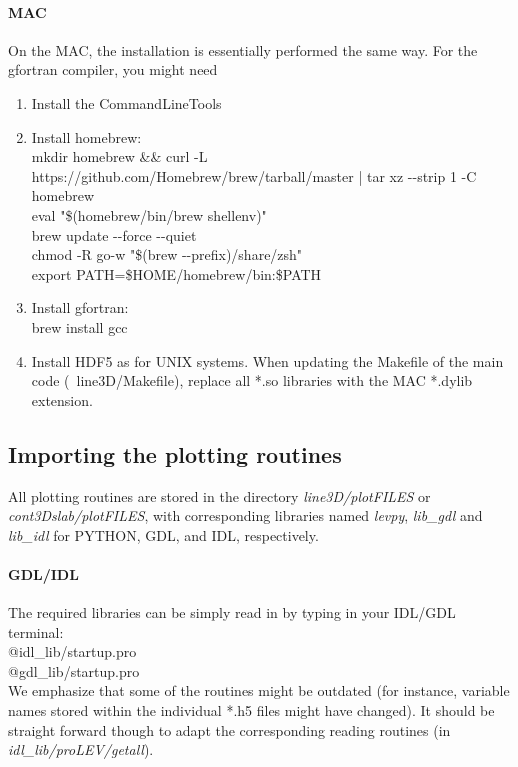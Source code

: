 \documentclass[10pt,a4paper]{article}
\begin{document}
\paragraph{MAC}
On the MAC, the installation is essentially performed the same way. For the gfortran compiler, you might need
\begin{enumerate}
\item Install the CommandLineTools
\item Install homebrew:\\
  mkdir homebrew \&\& curl -L https://github.com/Homebrew/brew/tarball/master | tar xz -{}-strip 1 -C homebrew \\
  eval "\$(homebrew/bin/brew shellenv)" \\
  brew update -{}-force -{}-quiet \\
  chmod -R go-w "\$(brew -{}-prefix)/share/zsh"  \\
  export PATH=\$HOME/homebrew/bin:\$PATH
\item Install gfortran:\\
  brew install gcc
\item Install HDF5 as for UNIX systems. When updating the Makefile of
  the main code (\eg~line3D/Makefile), replace all *.so libraries with
  the MAC *.dylib extension.
\end{enumerate}

\subsection{Importing the plotting routines}
All plotting routines are stored in the directory
\textit{line3D/plotFILES} or \textit{cont3Dslab/plotFILES}, with
corresponding libraries named \textit{levpy}, \textit{lib\_gdl} and
\textit{lib\_idl} for \textsc{PYTHON}, \textsc{GDL}, and \textsc{IDL},
respectively.
%
\paragraph{GDL/IDL}
The required libraries can be simply read in by typing in your IDL/GDL terminal:\\
@idl\_lib/startup.pro \\
@gdl\_lib/startup.pro \\

We emphasize that some of the routines might be outdated (for
instance, variable names stored within the individual *.h5 files might
have changed). It should be straight forward though to adapt the
corresponding reading routines (in \textit{idl\_lib/proLEV/getall}).
%
\end{document}
